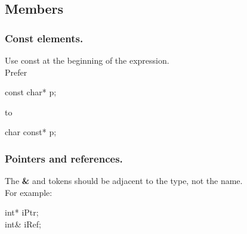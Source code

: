 \subsection{Members}
\subsubsection{Const elements.}
Use const at the beginning of the expression.\\
Prefer
\begin{algorithm}[H]
const char* p;
\end{algorithm}

to
\begin{algorithm}[H]
char const* p;
\end{algorithm}

\subsubsection{Pointers and references.}
The {\bf \&} and {\bf *} tokens should be adjacent to the type, not
the name.\\

For example:
\begin{algorithm}[H]
int* iPtr;\\
int\& iRef;
\end{algorithm}
